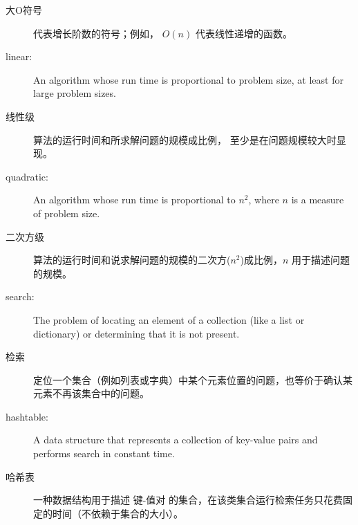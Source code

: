 \begin{description}
\item[大O符号] 代表增长阶数的符号；例如， $O(n)$ 代表线性递增的函数。

\item[linear:] An algorithm whose run time is proportional to
problem size, at least for large problem sizes.

\item[线性级] 算法的运行时间和所求解问题的规模成比例， 至少是在问题规模较大时显现。 

\item[quadratic:] An algorithm whose run time is proportional to
$n^2$, where $n$ is a measure of problem size.

\item[二次方级] 算法的运行时间和说求解问题的规模的二次方($n^2$)成比例，$n$ 用于描述问题的规模。

\item[search:] The problem of locating an element of a collection
(like a list or dictionary) or determining that it is not present.

\item[检索] 定位一个集合（例如列表或字典）中某个元素位置的问题，也等价于确认某元素不再该集合中的问题。

\item[hashtable:] A data structure that represents a collection of
key-value pairs and performs search in constant time.

\item[哈希表] 一种数据结构用于描述 键-值对 的集合，在该类集合运行检索任务只花费固定的时间（不依赖于集合的大小）。

\end{description}
